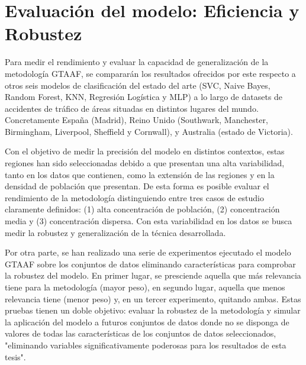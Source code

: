 \documentclass{uathesis-es}
\begin{document}
	
	\section{Evaluación del modelo: Eficiencia y Robustez}
	
	Para medir el rendimiento y evaluar la capacidad de generalización de la metodología GTAAF, se compararán los resultados ofrecidos por este respecto a otros seis modelos de clasificación del estado del arte (SVC, Naive Bayes, Random Forest, KNN, Regresión Logística y MLP) a lo largo de datasets de accidentes de tráfico de áreas situadas en distintos lugares del mundo. Concretamente España (Madrid), Reino Unido (Southwark, Manchester, Birmingham, Liverpool, Sheffield y Cornwall), y Australia (estado de Victoria).
	
	Con el objetivo de medir la precisión del modelo en distintos contextos, estas regiones han sido seleccionadas debido a que presentan una alta variabilidad, tanto en los datos que contienen, como la extensión de las regiones y en la densidad de población que presentan. De esta forma es posible evaluar el rendimiento de la metodología distinguiendo entre tres casos de estudio claramente definidos: (1) alta concentración de población, (2) concentración media y (3) concentración dispersa. Con esta variabilidad en los datos se busca medir la robustez y generalización de la técnica desarrollada.
	
	Por otra parte, se han realizado una serie de experimentos ejecutado el modelo GTAAF sobre los conjuntos de datos eliminando características para comprobar la robustez del modelo. En primer lugar, se presciende aquella que más relevancia tiene para la metodología (mayor peso), en segundo lugar, aquella que menos relevancia tiene (menor peso) y, en un tercer experimento, quitando ambas. Estas pruebas tienen un doble objetivo: evaluar la robustez de la metodología y simular la aplicación del modelo a futuros conjuntos de datos donde no se disponga de valores de todas las características de los conjuntos de datos seleccionados, "eliminando variables significativamente poderosas para los resultados de esta tesis".
	
\end{document}
